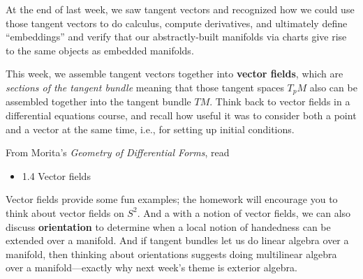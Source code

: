 \documentclass{homework}
\author{Jim Fowler}
\date{Week 3: Vector fields}
\begin{document}
\maketitle

At the end of last week, we saw tangent vectors and recognized how we
could use those tangent vectors to do calculus, compute derivatives,
and ultimately define ``embeddings'' and verify that our
abstractly-built manifolds via charts give rise to the same objects as
embedded manifolds.

This week, we assemble tangent vectors together into \textbf{vector
  fields}, which are \textit{sections of the tangent bundle} meaning
that those tangent spaces $T_p M$ also can be assembled together into
the tangent bundle $TM$.  Think back to vector fields in a
differential equations course, and recall how useful it was to
consider both a point and a vector at the same time, i.e., for setting
up initial conditions.

From Morita's \textit{Geometry of Differential Forms}, read
\begin{itemize}
\item 1.4 Vector fields
\end{itemize}
Vector fields provide some fun examples; the homework will encourage
you to think about vector fields on $S^2$.  And a with a notion of
vector fields, we can also discuss \textbf{orientation} to determine
when a local notion of handedness can be extended over a manifold.
And if tangent bundles let us do linear algebra over a manifold, then
thinking about orientations suggests doing multilinear algebra over a
manifold---exactly why next week's theme is exterior algebra.
\end{document}
